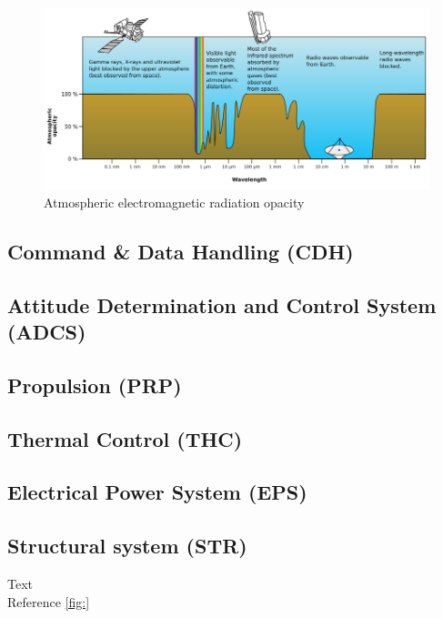 \begin{figure}[h]
	\centering
	\includegraphics[width=\textwidth]{img/earth_freq.png}
	\caption{Atmospheric electromagnetic radiation opacity}
	\label{fig:frequency_atmosphere_opacity}
\end{figure}



\subsection{Command \& Data Handling (CDH)}

\subsection{Attitude Determination and Control System (ADCS)}

\subsection{Propulsion (PRP)}

\subsection{Thermal Control (THC)}

\subsection{Electrical Power System (EPS)}

\subsection{Structural system (STR)}



Text\\

Reference \ref{fig:}\\
